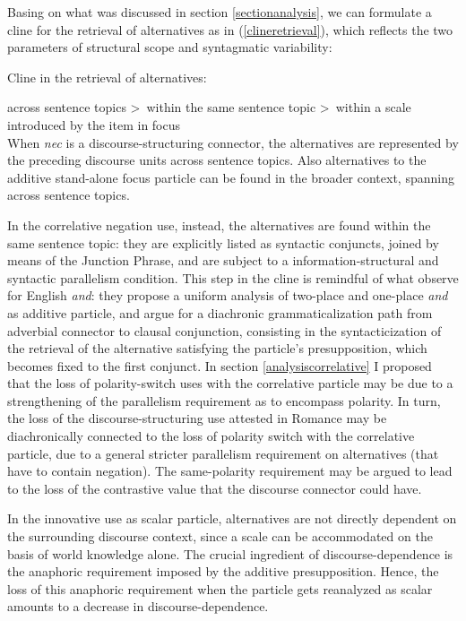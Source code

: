 \documentclass[output=paper,modfonts,nonflat,citecolor=brown,
showindex
]{langsci/langscibook}
\begin{document}
Basing on what was discussed in section \ref{sectionanalysis}, we can formulate a cline for the retrieval of alternatives as in (\ref{clineretrieval}), which reflects the two parameters of structural scope and syntagmatic variability: 

{\begin{exe}
\ex \label{clineretrieval} Cline in the retrieval of alternatives:
\end{exe}}

\noindent across sentence topics \textgreater \ within the same sentence topic \textgreater \ within a scale introduced by the item in focus\\

\noindent When {\em{nec}} is a discourse-structuring connector, the alternatives are represented by the preceding discourse units across sentence topics. Also alternatives to the additive stand-alone focus particle can be found in the broader context, spanning across sentence topics. 

In the correlative negation use, instead, the alternatives are found within the same sentence topic: they are explicitly listed as syntactic conjuncts, joined by means of the Junction Phrase, and are subject to a information-structural and syntactic parallelism condition. This step in the cline is remindful of what \citet{ZeevatJasinskaja07} observe for English {\em{and}}: they propose a uniform analysis of two-place and one-place {\em{and}} as additive particle, and argue for a diachronic grammaticalization path from adverbial connector to clausal conjunction, consisting in the syntacticization of the retrieval of the alternative satisfying the particle's presupposition, which becomes fixed to the first conjunct. In section \ref{analysiscorrelative} I proposed that the loss of polarity-switch uses with the correlative particle may be due to a strengthening of the parallelism requirement as to encompass polarity. In turn, the loss of the discourse-structuring use attested in Romance may be diachronically connected to the loss of polarity switch with the correlative particle, due to a general stricter parallelism requirement on alternatives (that have to contain negation). The same-polarity requirement may be argued to lead to the loss of the contrastive value that the discourse connector could have.

In the innovative use as scalar particle, alternatives are not directly dependent on the surrounding discourse context, since a scale can be accommodated on the basis of world knowledge alone. The crucial ingredient of discourse-dependence is the anaphoric requirement imposed by the additive presupposition. Hence, the loss of this anaphoric requirement when the particle gets reanalyzed as scalar amounts to a decrease in discourse-dependence.
\end{document}
